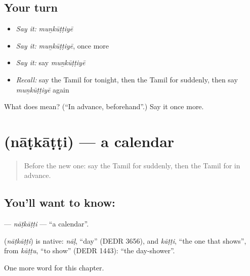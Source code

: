 \subsection*{Your turn}
\begin{itemize}
\raggedright
  \item \emph{Say it:} \emph{muṉkūṭṭiyē}
  \item \emph{Say it:} \emph{muṉkūṭṭiyē}, once more
  \item \emph{Say it:} say \emph{muṉkūṭṭiyē}
  \item \emph{Recall:} say the Tamil for tonight, then the Tamil for suddenly, then say \emph{muṉkūṭṭiyē} again
\end{itemize}

\begin{tcolorbox}[breakable,colback=teal!4,colframe=teal!35!black,title={Before you move on}]
What does  mean? (\textquotedblleft{}In advance, beforehand\textquotedblright{}.) Say it once more.
\end{tcolorbox}
\section[\texorpdfstring{\ta{நாட்காட்டி} (nāṭkāṭṭi)}{நாட்காட்டி (nāṭkāṭṭi)}]{ (nāṭkāṭṭi) — a calendar}

\label{lesson:TA-C172-natkatti}



\begin{quote}
Before the new one: say the Tamil for suddenly, then the Tamil for in advance.
\end{quote}

\subsection*{You'll want to know: }
\textbf{} — \emph{nāṭkāṭṭi} — \textquotedblleft{}a calendar\textquotedblright{}.

\begin{cousinweb}
\textbf{} (\emph{nāṭkāṭṭi}) is native: \emph{nāḷ}, \textquotedblleft{}day\textquotedblright{} (DEDR 3656), and \emph{kāṭṭi}, \textquotedblleft{}the one that shows\textquotedblright{}, from \emph{kāṭṭu}, \textquotedblleft{}to show\textquotedblright{} (DEDR 1443): \textquotedblleft{}the day-shower\textquotedblright{}.
\end{cousinweb}

\begin{grammarlens}[title={What you've built}]
One more word for this chapter.
\end{grammarlens}

